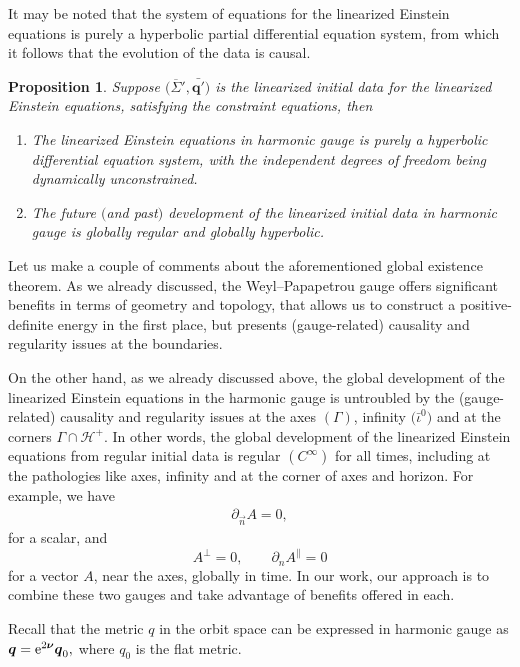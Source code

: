 \documentclass[pdftex]{sigma}
\def\ptl{\partial}%
\def\mbo#1{\boldsymbol{#1}}%
\def\olin#1{\overline{#1}{}}%
\numberwithin{equation}{section}
\newtheorem{Proposition}[Theorem]{Proposition}
\begin{document}
It may be noted that the system of equations for the linearized Einstein equations is purely a hyperbolic partial differential equation system, from which it follows that the evolution of the data is causal.
\begin{Proposition}
Suppose $\bigl(\olin{\Sigma}', \bar{\mbo{q}'}\bigr)$ is the linearized initial data for the linearized Einstein equations, satisfying the constraint equations, then
\begin{enumerate}\itemsep=0pt
\item[$(1)$] The linearized Einstein equations in harmonic gauge is purely a hyperbolic differential equation system, with the independent degrees of freedom being dynamically unconstrained.
\item[$(2)$] The future $($and past$)$ development of the linearized initial data in harmonic gauge is globally regular and globally hyperbolic.
\end{enumerate}
\end{Proposition}
Let us make a couple of comments about the aforementioned global existence theorem. As we already discussed, the Weyl--Papapetrou gauge offers significant benefits in terms of geometry and topology, that allows us to construct a positive-definite energy in the first place, but presents (gauge-related) causality and regularity issues at the boundaries.

On the other hand, as we already discussed above, the global development of the linearized Einstein equations in the harmonic gauge is untroubled by the (gauge-related) causality and regularity issues at the axes $(\Gamma)$, infinity $\bigl(\bar{\iota}^0\bigr)$ and at the corners $\Gamma \cap \mathcal{H}^+$. In other words, the global development of the linearized Einstein equations from regular initial data is regular $(C^\infty)$ for all times, including at the pathologies like axes, infinity and at the corner of axes and horizon. For example, we have
\begin{align*}
\ptl_{\vec{n}} A =0,
\end{align*}
for a scalar, and
\[
A^{\perp} =0, \qquad \ptl_n A^{\parallel} =0
\]
for a vector $A$, near the axes, globally in time. In our work, our approach is to combine these two gauges and take advantage of benefits offered in each.

Recall that the metric $q$ in the orbit space can be expressed in harmonic gauge as $\mbo{q} = {\rm e}^{2 \mbo{\nu}} \mbo{q}_0, $ where $q_0$ is the flat metric.
\end{document}
